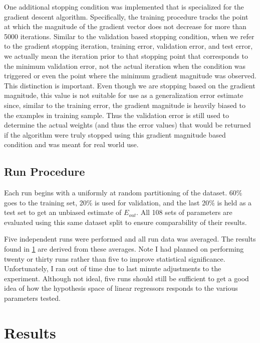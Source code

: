 \documentclass[runningheads]{llncs_2}
\begin{document}
One additional stopping condition was implemented that is specialized for the gradient descent algorithm. Specifically, the training procedure tracks the point at which the magnitude of the gradient vector does not decrease for more than 5000 iterations. Similar to the validation based stopping condition, when we refer to the gradient stopping iteration, training error, validation error, and test error, we actually mean the iteration prior to that stopping point that corresponds to the minimum validation error, not the actual iteration when the condition was triggered or even the point where the minimum gradient magnitude was observed. This distinction is important. Even though we are stopping based on the gradient magnitude, this value is not suitable for use as a generalization error estimate since, similar to the training error, the gradient magnitude is heavily biased to the examples in training sample. Thus the validation error is still used to determine the actual weights (and thus the error values) that would be returned if the algorithm were truly stopped using this gradient magnitude based condition and was meant for real world use.

\subsection{Run Procedure}

Each run begins with a uniformly at random partitioning of the dataset. 60\% goes to the training set, 20\% is used for validation, and the last 20\% is held as a test set to get an unbiased estimate of $E_{out}$. All 108 sets of parameters are evaluated using this same dataset split to ensure comparability of their results.

Five independent runs were performed and all run data was averaged. The results found in \ref{sec:results} are derived from these averages. Note I had planned on performing twenty or thirty runs rather than five to improve statistical significance. Unfortunately, I ran out of time due to last minute adjustments to the experiment. Although not ideal, five runs should still be sufficient to get a good idea of how the hypothesis space of linear regressors responds to the various parameters tested.  



\section{Results}
\label{sec:results}
\end{document}
